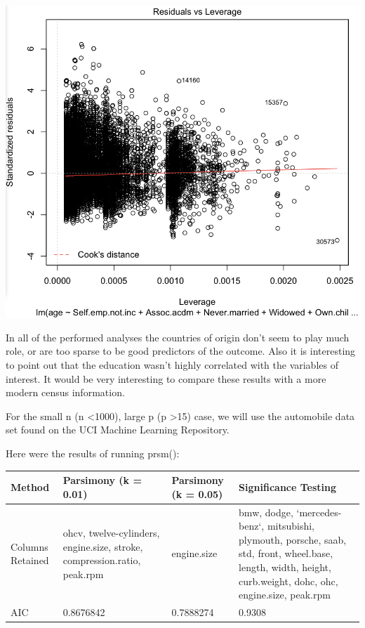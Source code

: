 \documentclass[letter]{article}
\begin{document}
 \includegraphics[scale=0.5]{cookResidCensus.png}

In all of the performed analyses the countries of origin don't seem to play much role, or are too sparse to be good predictors of the outcome. Also it is interesting to point out that the education wasn't highly correlated with the variables of interest. It would be very interesting to compare these results with a more modern census information.

\newpage


For the small n (n \textless 1000), large p (p \textgreater 15) case, we will use the automobile data set found on the UCI Machine Learning Repository.

Here were the results of running prsm(): \\

\begin{center}
    \begin{tabular}{ | l |  p{4cm} |  p{4cm} | p{4cm} |}
    \hline
    Method & Parsimony (k = 0.01) & Parsimony (k = 0.05) & Significance Testing \\ \hline
    
    Columns Retained & ohcv, twelve-cylinders, engine.size, stroke, compression.ratio, peak.rpm & engine.size & bmw, dodge, `mercedes-benz`, mitsubishi, plymouth, porsche, saab, std, front, wheel.base, length, width, height, curb.weight, dohc, ohc, engine.size, peak.rpm\\ \hline
    
    AIC & 0.8676842 & 0.7888274 & 0.9308\\ \hline
    
    \end{tabular}
\end{center}
\end{document}
